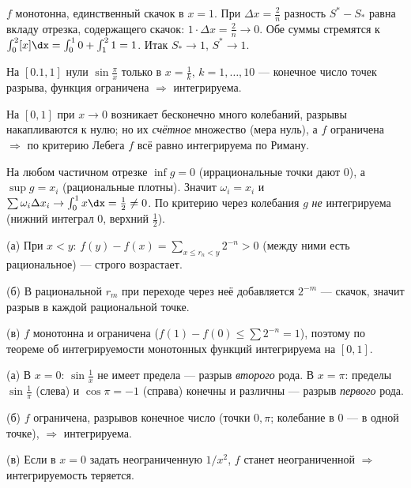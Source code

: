 \sol $f$ монотонна, единственный скачок в $x=1$. При $\Delta x=\tfrac2n$ разность
$S^*-S_*$ равна вкладу отрезка, содержащего скачок: $1\cdot\Delta x=\tfrac2n\to0$. Обе суммы
стремятся к $\int_0^2[x]\dx=\int_0^1 0+\int_1^2 1=1$. Итак $S_*\to1$, $S^*\to1$.

\sol На $[0.1,1]$ нули $\sin\tfrac\pi x$ только в $x=\tfrac1k$, $k=1,\dots,10$ — конечное число точек
разрыва, функция ограничена $\Rightarrow$ интегрируема.

На $[0,1]$ при $x\to0$ возникает бесконечно
много колебаний, разрывы накапливаются к нулю; но их \emph{счётное} множество (мера нуль), а $f$
ограничена $\Rightarrow$ по критерию Лебега $f$ всё равно интегрируема по Риману.

\sol На любом частичном отрезке $\inf g=0$ (иррациональные точки дают $0$), а $\sup g=x_i$
(рациональные плотны). Значит $\omega_i=x_i$ и $\sum\omega_i\Delta x_i\to\int_0^1 x\dx=\tfrac12\ne0$.
По критерию через колебания $g$ \emph{не} интегрируема (нижний интеграл $0$, верхний $\tfrac12$).

\sol (а) При $x<y$: $f(y)-f(x)=\sum_{x\le r_n<y}2^{-n}>0$ (между ними есть рациональное) — строго
возрастает.

(б) В рациональной $r_m$ при переходе через неё добавляется $2^{-m}$ — скачок, значит
разрыв в каждой рациональной точке.

(в) $f$ монотонна и ограничена ($f(1)-f(0)\le\sum2^{-n}=1$),
поэтому по теореме об интегрируемости монотонных функций интегрируема на $[0,1]$.

\task{29}{$f=\sin\tfrac1x$ на $(0,\pi]$, $\cos x$ на $(\pi,2\pi]$, $f=5$ при $x=0,\pi$.}
\sol (а) В $x=0$: $\sin\tfrac1x$ не имеет предела — разрыв \emph{второго} рода. В $x=\pi$: пределы
$\sin\tfrac1\pi$ (слева) и $\cos\pi=-1$ (справа) конечны и различны — разрыв \emph{первого} рода.

(б) $f$ ограничена, разрывов конечное число (точки $0,\pi$; колебание в $0$ — в одной точке),
$\Rightarrow$ интегрируема.

(в) Если в $x=0$ задать неограниченную $1/x^2$, $f$ станет неограниченной
$\Rightarrow$ интегрируемость теряется.

